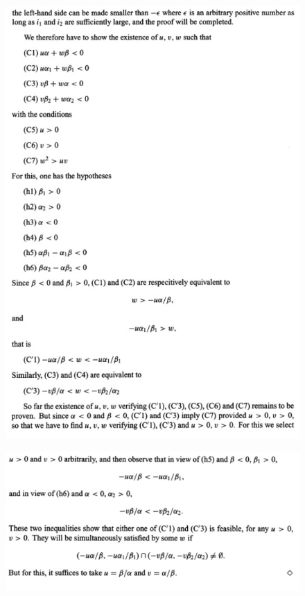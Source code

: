 \begin{figure}[H]
\centering
\includegraphics[width=\textwidth]{week12/f_3}
\end{figure}
\begin{figure}[H]
\centering
\includegraphics[width=\textwidth]{week12/f_4}
\end{figure}











